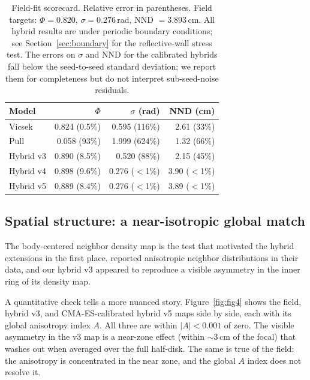 \documentclass[11pt]{article}
\begin{document}
\begin{table}[t]
\centering
\small
\caption{Field-fit scorecard. Relative error in parentheses. Field targets:
$\Phi = 0.820$, $\sigma = 0.276$\,rad, NND $= 3.893$\,cm. All hybrid
results are under periodic boundary conditions; see
Section~\ref{sec:boundary} for the reflective-wall stress test. The
errors on $\sigma$ and NND for the calibrated hybrids fall below the
seed-to-seed standard deviation; we report them for completeness but do
not interpret sub-seed-noise residuals.}
\label{tab:scorecard}
\begin{tabular}{lrrr}
\toprule
Model       & $\Phi$               & $\sigma$ (rad)     & NND (cm)              \\
\midrule
Vicsek      & 0.824 (0.5\%)        & 0.595 (116\%)      & 2.61 (33\%)           \\
Pull        & 0.058 (93\%)         & 1.999 (624\%)      & 1.32 (66\%)           \\
Hybrid v3   & 0.890 (8.5\%)        & 0.520 (88\%)       & 2.15 (45\%)           \\
Hybrid v4   & 0.898 (9.6\%)        & 0.276 ($<$1\%)     & 3.90 ($<$1\%)         \\
Hybrid v5   & 0.889 (8.4\%)        & 0.276 ($<$1\%)     & 3.89 ($<$1\%)         \\
\bottomrule
\end{tabular}
\end{table}

\subsection{Spatial structure: a near-isotropic global match}
\label{sec:spatial}

The body-centered neighbor density map is the test that motivated the
hybrid extensions in the first place. \citet{weinburd2024} reported
anisotropic neighbor distributions in their data, and our hybrid v3
appeared to reproduce a visible asymmetry in the inner ring of its
density map.

A quantitative check tells a more nuanced story. Figure~\ref{fig:fig4}
shows the field, hybrid v3, and CMA-ES-calibrated hybrid v5 maps side by
side, each with its global anisotropy index $A$. All three are within
$|A| < 0.001$ of zero. The visible asymmetry in the v3 map is a
near-zone effect (within $\sim 3$\,cm of the focal) that washes out when
averaged over the full half-disk. The same is true of the field: the
\citet{weinburd2024} anisotropy is concentrated in the near zone, and
the global $A$ index does not resolve it.
\end{document}
